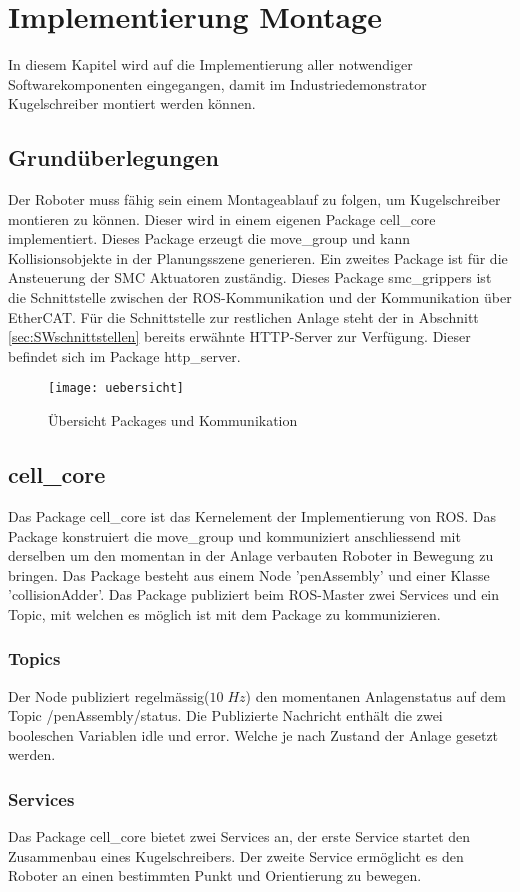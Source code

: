 \chapter{Implementierung Montage}
In diesem Kapitel wird auf die Implementierung aller notwendiger Softwarekomponenten eingegangen, damit im Industriedemonstrator Kugelschreiber montiert werden können. 
\section{Grundüberlegungen}
Der Roboter muss fähig sein einem Montageablauf zu folgen, um Kugelschreiber montieren zu können. Dieser wird in einem eigenen Package cell\_core implementiert. Dieses Package erzeugt die move\_group und kann Kollisionsobjekte in der Planungsszene generieren. Ein zweites Package ist für die Ansteuerung der SMC Aktuatoren zuständig. Dieses Package smc\_grippers ist die Schnittstelle zwischen der ROS-Kommunikation und der Kommunikation über EtherCAT. Für die Schnittstelle zur restlichen Anlage steht der in Abschnitt \ref{sec:SWschnittstellen} bereits erwähnte HTTP-Server zur Verfügung. Dieser befindet sich im Package http\_server.
\begin{figure}[H]
	\centering
	\texttt{[image: uebersicht]}
	\caption{Übersicht Packages und Kommunikation}
	\label{fig:Uebersicht}
\end{figure}

\section{cell\_core}
Das Package cell\_core ist das Kernelement der Implementierung von ROS. Das Package konstruiert die move\_group und kommuniziert anschliessend mit derselben um den momentan in der Anlage verbauten Roboter in Bewegung zu bringen. Das Package besteht aus einem Node 'penAssembly' und einer Klasse 'collisionAdder'. Das Package publiziert beim ROS-Master zwei Services und ein Topic, mit welchen es möglich ist mit dem Package zu kommunizieren.

\subsection{Topics}
Der Node publiziert regelmässig($10\;Hz$) den momentanen Anlagenstatus auf dem Topic /penAssembly/status. Die Publizierte Nachricht enthält die zwei booleschen Variablen idle und error. Welche je nach Zustand der Anlage gesetzt werden.

\subsection{Services}
Das Package cell\_core bietet zwei Services an, der erste Service startet den Zusammenbau eines Kugelschreibers. Der zweite Service ermöglicht es den Roboter an einen bestimmten Punkt und Orientierung zu bewegen.
